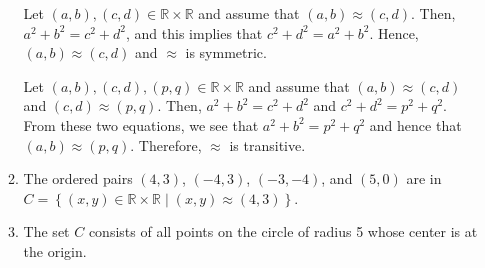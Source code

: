 \begin{enumerate}
\begin{enumerate}
Let $\left( {a, b} \right), \left( {c, d} \right) \in \mathbb{R} \times \mathbb{R}$ and assume that $\left( {a, b} \right) \approx \left( {c, d} \right)$.  Then, $a^2  + b^2  = c^2  + d^2 $, and this implies that $c^2  + d^2  = a^2  + b^2 $.  Hence, 
$\left( {a, b} \right) \approx \left( {c, d} \right)$ and $\approx$ is symmetric.

Let $\left( {a, b} \right), \left( {c, d} \right), \left( {p, q} \right) \in \mathbb{R} \times \mathbb{R}$ and assume that $\left( {a, b} \right) \approx \left( {c, d} \right)$ and 
$\left( {c, d} \right) \approx \left( {p, q} \right)$.  Then, $a^2  + b^2  = c^2  + d^2 $ and 
$c^2  + d^2  = p^2  + q^2 $.  From these two equations, we see that 
$a^2  + b^2  = p^2  + q^2 $ and hence that $\left( {a, b} \right) \approx \left( {p, q} \right)$.  Therefore, $\approx$ is transitive.

\item The ordered pairs $\left( 4, 3 \right)$, $\left( -4, 3 \right)$, 
$\left( -3, -4 \right)$, and $\left( 5, 0 \right)$ are in \\
$C = \left\{ { {\left( {x, y} \right) \in \mathbb{R} \times \mathbb{R} } \mid                 \left( {x, y} \right) \approx \left( {4, 3} \right)} \right\}$.

\item The set $C$ consists of all points on the circle of radius 5 whose center is at the origin.
\end{enumerate}
\end{enumerate}





